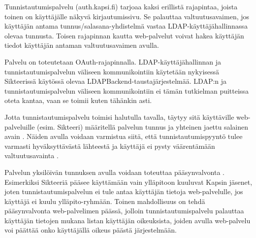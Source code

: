 Tunnistautumispalvelu (auth.kapsi.fi) tarjoaa kaksi erillistä rajapintaa, joista toinen on käyttäjälle näkyvä kirjautumissivu. Se palauttaa valtuutusavaimen, jos käyttäjän antama tunnus/salasana-yhdistelmä vastaa LDAP-käyttäjähallinnassa olevaa tunnusta. Toisen rajapinnan kautta web-palvelut voivat hakea käyttäjän tiedot käyttäjän antaman valtuutusavaimen avulla.

Palvelu on toteutetaan OAuth-rajapinnalla. LDAP-käyttäjähallinnan ja tunnistautumispalvelun väliseen kommunikointiin käytetään nykyisessä Sikteerissä käytössä olevaa LDAPBackend-taustajärjestelmää. LDAP:n ja tunnistautumispalvelun väliseen kommunikointiin ei tämän tutkielman puitteissa oteta kantaa, vaan se toimii kuten tähänkin asti.

Jotta tunnistautumispalvelu toimisi halutulla tavalla, täytyy sitä käyttäville web-palveluille (esim. Sikteeri) määritellä palvelun tunnus ja yhteinen jaettu salainen avain \cite{oauth2_0}. Näiden avulla voidaan varmistua siitä, että tunnistautumispyyntö tulee varmasti hyväksyttävästä lähteestä ja käyttäjä ei pysty väärentämään valtuutusavainta \cite{oauth2_0}.

Palvelun yksilöivän tunnuksen avulla voidaan toteuttaa pääsynvalvonta \cite{oauth2_0}. Esimerkiksi Sikteeriä pääsee käyttämään vain ylläpitoon kuuluvat Kapsin jäsenet, joten tunnistautumispalvelun ei tule antaa käyttäjän tietoja web-palvelulle, jos käyttäjä ei kuulu ylläpito-ryhmään. Toinen mahdollisuus on tehdä pääsynvalvonta web-palvelimen päässä, jolloin tunnistautumispalvelu palauttaa käyttäjän tietojen mukana listan käyttäjän oikeuksista, joiden avulla web-palvelu voi päättää onko käyttäjällä oikeus päästä järjestelmään.